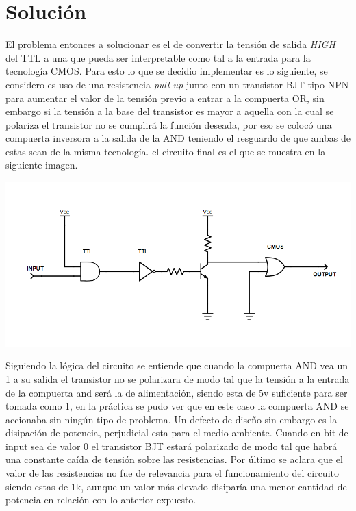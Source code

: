 \section{Solución}
El problema entonces a solucionar es el de convertir la tensión de salida \textit{HIGH} del TTL a una que pueda ser interpretable como tal a la entrada para la tecnología CMOS.
Para esto lo que se decidio implementar es lo siguiente, se considero es uso de una resistencia \textit{pull-up} junto con un transistor BJT tipo NPN para aumentar el valor de la tensión previo a entrar a la compuerta OR, sin embargo si la tensión a la base del transistor es mayor a aquella con la cual se polariza el transistor no se cumplirá la función deseada, por eso se colocó una compuerta inversora a la salida de la AND teniendo el resguardo de que ambas de estas sean de la misma tecnología. el circuito final es el que se muestra en la siguiente imagen.
\begin{center}
\includegraphics[scale = 0.8,keepaspectratio]{../5-TTL&CMOS/E3-ej5-corregido.png}
\end{center}

Siguiendo la lógica del circuito se entiende que cuando la compuerta AND vea un 1 a su salida el transistor no se polarizara de modo tal que la tensión a la entrada de la compuerta and será la de alimentación, siendo esta de 5v suficiente para ser tomada como 1, en la práctica se pudo ver que en este caso la compuerta AND se accionaba sin ningún tipo de problema.
Un defecto de diseño sin embargo es la disipación de potencia, perjudicial esta para el medio ambiente. Cuando en bit de input sea de valor 0 el transistor BJT estará polarizado de modo tal que habrá una constante caída de tensión sobre las resistencias.
Por último se aclara que el valor de las resistencias no fue de relevancia para el funcionamiento del circuito siendo estas de 1k, aunque un valor más elevado disiparía una menor cantidad de potencia en relación con lo anterior expuesto.
